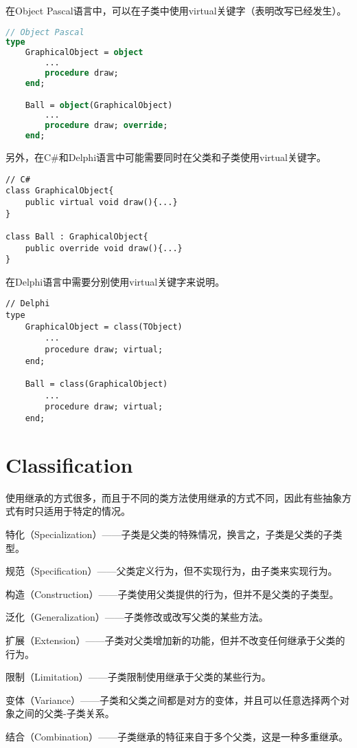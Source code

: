 在Object Pascal语言中，可以在子类中使用virtual关键字（表明改写已经发生）。


\begin{lstlisting}[language=Pascal]
// Object Pascal
type
	GraphicalObject = object
		...
		procedure draw;
	end;

	Ball = object(GraphicalObject)
		...
		procedure draw; override;
	end;
\end{lstlisting}

另外，在C\#和Delphi语言中可能需要同时在父类和子类使用virtual关键字。



\begin{lstlisting}[language={[Sharp]C}]
// C#
class GraphicalObject{
	public virtual void draw(){...}
}

class Ball : GraphicalObject{
	public override void draw(){...}
}
\end{lstlisting}

在Delphi语言中需要分别使用virtual关键字来说明。



\begin{lstlisting}[language=Delphi]
// Delphi
type
	GraphicalObject = class(TObject)
		...
		procedure draw; virtual;
	end;

	Ball = class(GraphicalObject)
		...
		procedure draw; virtual;
	end;
\end{lstlisting}


\chapter{Classification}

使用继承的方式很多，而且于不同的类方法使用继承的方式不同，因此有些抽象方式有时只适用于特定的情况。

\begin{compactitem}
\item 特化（Specialization）——子类是父类的特殊情况，换言之，子类是父类的子类型。
\item 规范（Specification）——父类定义行为，但不实现行为，由子类来实现行为。
\item 构造（Construction）——子类使用父类提供的行为，但并不是父类的子类型。
\item 泛化（Generalization）——子类修改或改写父类的某些方法。
\item 扩展（Extension）——子类对父类增加新的功能，但并不改变任何继承于父类的行为。
\item 限制（Limitation）——子类限制使用继承于父类的某些行为。
\item 变体（Variance）——子类和父类之间都是对方的变体，并且可以任意选择两个对象之间的父类-子类关系。
\item 结合（Combination）——子类继承的特征来自于多个父类，这是一种多重继承。
\end{compactitem}



